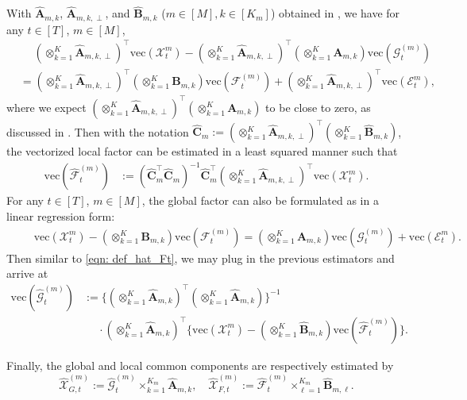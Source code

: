 \documentclass[aos]{imsart}
\theoremstyle{plain}
\theoremstyle{definition}
\def\wh#1{\widehat{#1}}
\def\cE{\mathcal{E}}
\def\cF{\mathcal{F}}
\def\cG{\mathcal{G}} \def\cH{\boldsymbol{\mathcal{H}}} \def\cI{\mathcal{I}}
\def\cX{\mathcal{X}}
\def\bA{\mathbf{A}}
\def\bB{\mathbf{B}}
\def\bC{\mathbf{C}}
\def\trans{\intercal}
\def\vec{\mathrm{vec}}
\begin{document}
With $\wh{\bA}_{m,k}$, $\wh{\bA}_{m,k,\perp}$, and $\wh{\bB}_{m,k}$ ($m\in[M], k\in[K_m]$) obtained in , we have for any $t\in[T]$, $m\in[M]$,
\begin{align*}
    &\;\quad
    (\otimes_{k=1}^K \wh{\bA}_{m,k,\perp})^\trans \vec(\cX_t^{m}) - (\otimes_{k=1}^K \wh{\bA}_{m,k,\perp})^\trans (\otimes_{k=1}^K \bA_{m,k}) \vec(\cG_t^{(m)}) \\
    &= (\otimes_{k=1}^K \wh{\bA}_{m,k,\perp})^\trans (\otimes_{k=1}^K \bB_{m,k}) \vec(\cF_t^{(m)}) + (\otimes_{k=1}^K \wh{\bA}_{m,k,\perp})^\trans \vec(\cE_t^{m}) ,
\end{align*}
where we expect $(\otimes_{k=1}^K \wh{\bA}_{m,k,\perp})^\trans (\otimes_{k=1}^K \bA_{m,k})$ to be close to zero, as discussed in . Then with the notation $\wh{\bC}_m := (\otimes_{k=1}^K \wh{\bA}_{m,k,\perp})^\trans (\otimes_{k=1}^K \wh{\bB}_{m,k})$, the vectorized local factor can be estimated in a least squared manner such that
\begin{equation}
\label{eqn: def_hat_Ft}
\begin{split}
    \vec(\wh{\cF}_t^{(m)}) &:= (\wh{\bC}_m^\trans \wh{\bC}_m)^{-1} \wh{\bC}_m^\trans (\otimes_{k=1}^K \wh{\bA}_{m,k,\perp})^\trans \vec(\cX_t^{m}) .
\end{split}
\end{equation}
For any $t\in[T]$, $m\in[M]$, the global factor can also be formulated as in a linear regression form:
\begin{align*}
    &\;\quad
    \vec(\cX_t^{m}) - (\otimes_{k=1}^K \bB_{m,k}) \vec(\cF_t^{(m)}) = (\otimes_{k=1}^K \bA_{m,k}) \vec(\cG_t^{(m)}) + \vec(\cE_t^{m}) .
\end{align*}
Then similar to \eqref{eqn: def_hat_Ft}, we may plug in the previous estimators and arrive at
\begin{equation}
\label{eqn: def_hat_Gt}
\begin{split}
    \vec(\wh{\cG}_t^{(m)}) &:= \Big\{ (\otimes_{k=1}^K \wh{\bA}_{m,k})^\trans (\otimes_{k=1}^K \wh{\bA}_{m,k}) \Big\}^{-1} \\
    &\;\quad
    \cdot (\otimes_{k=1}^K \wh{\bA}_{m,k})^\trans \Big\{ \vec(\cX_t^{m}) - (\otimes_{k=1}^K \wh{\bB}_{m,k}) \vec(\wh\cF_t^{(m)}) \Big\} .
\end{split}
\end{equation}

Finally, the global and local common components are respectively estimated by
\[
\wh\cX_{G,t}^{(m)}:= \wh\cG_t^{(m)} \times_{k=1}^{K_m} \wh{\bA}_{m,k}, \quad
\wh\cX_{F,t}^{(m)}:= \wh\cF_t^{(m)} \times_{\ell=1}^{K_m} \wh{\bB}_{m,\ell} .
\]
\end{document}

